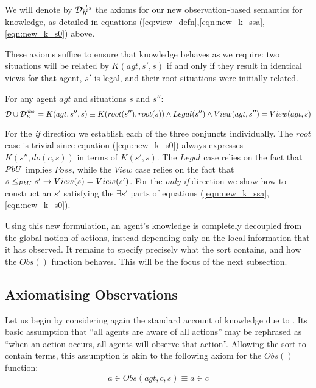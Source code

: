 \newpage{}

\begin{defn}
We will denote by $\mathcal{D}_{K}^{obs}$ the axioms for our new observation-based
semantics for knowledge, as detailed in equations (\ref{eq:view_defn},\ref{eqn:new_k_ssa},\ref{eqn:new_k_s0})
above.
\end{defn}
These axioms suffice to ensure that knowledge behaves as we require:
two situations will be related by $K(agt,s',s)$ if and only if they
result in identical views for that agent, $s'$ is legal, and their
root situations were initially related.

\begin{thm}
\label{thm:k_obs_equiv} For any agent $agt$ and situations $s$
and $s''$:\[
\mathcal{D}\cup\mathcal{D}_{K}^{obs}\models K(agt,s'',s)\equiv K(root(s''),root(s))\wedge Legal(s'')\wedge View(agt,s'')=View(agt,s)\]

\end{thm}
\begin{proofsketch}
For the\textbf{ }\emph{if} direction we establish each of the three
conjuncts individually. The $root$ case is trivial since equation
(\ref{eqn:new_k_s0}) always expresses $K(s'',do(c,s))$ in terms
of $K(s',s)$. The $Legal$ case relies on the fact that $PbU$ implies
$Poss$, while the $View$ case relies on the fact that $s\leq_{PbU}s'\rightarrow View(s)=View(s')$.
For the \emph{only-if} direction we show how to construct an $s'$
satisfying the $\exists s'$ parts of equations (\ref{eqn:new_k_ssa},\ref{eqn:new_k_s0}).
\end{proofsketch}
Using this new formulation, an agent's knowledge is completely decoupled
from the global notion of actions, instead depending only on the local
information that it has observed. It remains to specify precisely
what the  sort contains, and how the $Obs()$ function
behaves. This will be the focus of the next subsection.


\subsection{Axiomatising Observations}

Let us begin by considering again the standard account of knowledge
due to \citep{scherl03sc_knowledge}. Its basic assumption that {}``all
agents are aware of all actions'' may be rephrased as {}``when an
action occurs, all agents will observe that action''. Allowing the
 sort to contain  terms, this assumption
is akin to the following axiom for the $Obs()$ function:\begin{equation}
a\in Obs(agt,c,s)\equiv a\in c\label{eq:ax_obs_std1}\end{equation}



